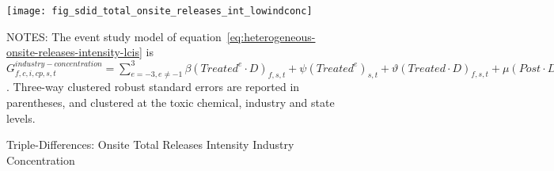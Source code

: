 \begin{figure}[H]
    \centering
    \texttt{[image: fig\_sdid\_total\_onsite\_releases\_int\_lowindconc]}
    \caption{Triple-Differences: Onsite Total Releases Intensity Industry Concentration}
    \label{fig:heterogeneous-onsite-releases-intensity-lcis}
    \begin{minipage}{18cm}
        \vspace{0.05in}
        NOTES: The event study model of equation~\ref{eq:heterogeneous-onsite-releases-intensity-lcis} is $G_{f,c,i,cp,s,t}^{industry-concentration} = \sum_{{e = -3},{e \neq -1}}^{3} \beta (Treated^{e} \cdot D)_{f,s,t} + \psi (Treated^{e})_{s,t} + \vartheta (Treated \cdot D)_{f,s,t} + \mu (Post \cdot D)_{f,s,t} + \tau Treated_{s,t} + \rho D_{f,s,t} + \alpha Post_{t} + \delta X_{v,c,t-1} + \omega F_{f,t} + \lambda_{t} + \gamma_{f} + \phi_{cp} + \zeta_{c} + \eta_{c,t} + \varepsilon_{f,cp,c,t}$. Three-way clustered robust standard errors are reported in parentheses, and clustered at the toxic chemical, industry and state levels.
    \end{minipage}
\end{figure}